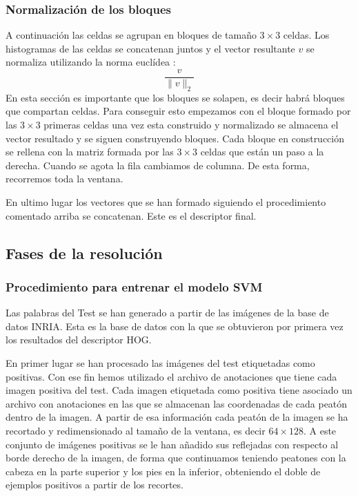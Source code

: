 \documentclass[a4paper,12pt]{article}
\begin{document}
\subsubsection{Normalización de los bloques}

A continuación las celdas se agrupan en bloques de tamaño
$3\times 3$ celdas. Los histogramas de las celdas se concatenan
juntos y el vector resultante $v$ se normaliza utilizando la
norma euclídea :
\[
  \frac{v}{\|v\|_2}
\]
En esta sección es importante que los bloques se solapen, es
decir habrá bloques que compartan celdas. Para conseguir esto
empezamos con el bloque formado por las $3\times 3$ primeras
celdas una vez esta construido y normalizado se almacena el
vector resultado y se siguen construyendo bloques. Cada bloque
en construcción se rellena con la matriz formada por las
$3\times 3$ celdas que están un paso a la derecha. Cuando
se agota la fila cambiamos de columna. De esta forma,
recorremos toda la ventana.

En ultimo lugar los vectores que se han formado siguiendo el
procedimiento comentado arriba se concatenan. Este es el
descriptor final.

\subsection{Fases de la resolución}


\subsubsection{Procedimiento para entrenar el modelo SVM}

Las palabras del Test se han generado a partir de las imágenes de
la base de datos INRIA. Esta es la base de datos con la que se
obtuvieron por primera vez los resultados del descriptor HOG.

En primer lugar se han procesado las imágenes del test etiquetadas
como positivas. Con ese fin hemos utilizado el archivo de anotaciones
que tiene cada imagen positiva del test. Cada imagen etiquetada como
positiva tiene asociado un archivo con anotaciones en las que se almacenan
las coordenadas de cada peatón dentro de la imagen. A partir de esa
información cada peatón de la imagen se ha recortado y redimensionado
al tamaño de la ventana, es decir $64\times 128$. A este conjunto de imágenes positivas se le han añadido sus reflejadas con respecto al borde derecho de la imagen, de forma que continuamos teniendo peatones con la cabeza en la parte superior y los pies en la inferior, obteniendo el doble de ejemplos positivos a partir de los recortes.
\end{document}

